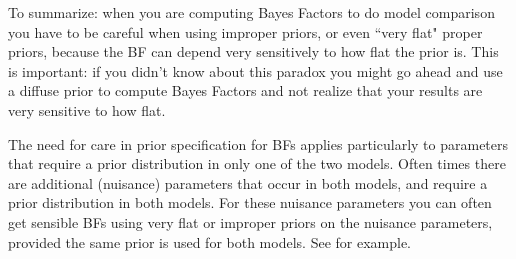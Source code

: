 \documentclass[12pt]{article}
\begin{document}
To summarize: when 
you are computing Bayes Factors to do model comparison
you have to be careful when 
using improper priors, or even ``very flat" proper priors, because
the BF can depend very sensitively to how flat the prior is. 
This is important:
if you didn't know about this paradox you might go ahead and use a diffuse prior
to compute Bayes Factors and not realize that your results are very sensitive to how flat.

The need for care in prior specification for BFs applies particularly to parameters that require a prior distribution in only one of the two models.
Often times there are additional (nuisance) parameters that 
occur in both models, and require a prior distribution in both models.
For these nuisance parameters you can often get sensible
BFs using very flat or improper priors on the nuisance parameters,
provided the same prior is used for both models.
 See \cite{servin.stephens.07} for example.

%
%


\end{document}
